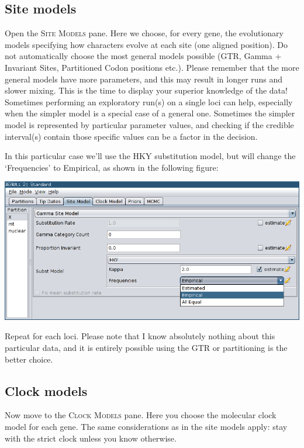 \documentclass[a4paper,11pt]{article}
\begin{document}
\subsection{Site models}

Open the \textsc{Site Models} pane. Here we choose, for every gene, the
evolutionary models specifying how characters evolve at each site (one aligned
position). Do not automatically choose the most general models possible (GTR,
Gamma + Invariant Sites, Partitioned Codon positions etc.). Please remember
that the more general models have more parameters, and this may result in
longer runs and slower mixing. This is the time to display your superior
knowledge of the data! Sometimes performing an exploratory run(s) on a single
loci can help, especially when the simpler model is a special case of a general
one. Sometimes the simpler model is represented by particular parameter values,
and checking if the credible interval(s) contain those specific values can be a
factor in the decision.

In this particular case we'll use the HKY substitution model, but will change
the `Frequencies' to Empirical, as shown in the following figure:

    \includegraphics[width=\textwidth]{figures/site_model.png}

Repeat for each loci. Please note that I know absolutely nothing about
this particular data, and it is entirely possible using the GTR or partitioning
is the better choice.

\subsection{Clock models}

Now move to the \textsc{Clock Models} pane. Here you choose the molecular clock
model for each gene. The same considerations as in the site models apply: stay
with the strict clock unless you know otherwise.
\end{document}
